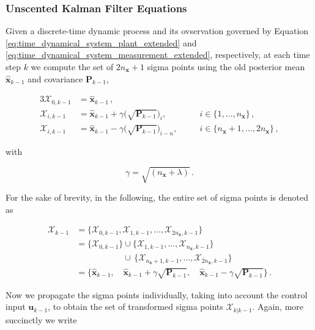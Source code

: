 \subsubsection{Unscented Kalman Filter Equations}

Given a discrete-time dynamic process and its ovservation governed by Equation \ref{eq:time_dynamical_system_plant_extended} and \ref{eq:time_dynamical_system_measurement_extended}, respectively, at each time step $k$ we compute the set of $2n_{\bm{x}}+1$ sigma points using the old posterior mean $\hat{\bm{x}}_{k-1}$ and covariance $\bm{P}_{k-1}$,

\begin{alignat}{3}
  \mathcal{X}_{0, k-1} &= \hat{\bm{x}}_{k-1}\,, \\
  \mathcal{X}_{i, k-1} &= \hat{\bm{x}}_{k-1} + \gamma \Big(\sqrt{ \bm{P}_{k-1}}\Big)_i, &&i \in \{1, \dots, n_{\bm{x}}\}\,, \\
  \mathcal{X}_{i, k-1} &= \hat{\bm{x}}_{k-1} - \gamma \Big(\sqrt{\bm{P}_{k-1}}\Big)_{i-n}, \quad &&i \in \{n_{\bm{x}}+1, \dots, 2n_{\bm{x}}\} \,,
\end{alignat}

\noindent
with

\begin{equation}
  \gamma = \sqrt{(n_{\bm{x}} + \lambda)}\,.
\end{equation}

\noindent
For the sake of brevity, in the following, the entire set of sigma points is denoted as

\begin{equation}
\begin{split}
  \bm{\mathcal{X}}_{k-1} &= \big\{\mathcal{X}_{0, k-1}, \mathcal{X}_{1, k-1}, \dots, \mathcal{X}_{2n_{\bm{x}}, k-1}\big\} \\
  &= \big\{\mathcal{X}_{0, k-1}\big\} \cup \big\{\mathcal{X}_{1, k-1}, \dots, \mathcal{X}_{n_{\bm{x}}, k-1}\big\} \\
  &\mathrel{\phantom{= \big\{\mathcal{X}_{0, k-1}\big\}}} \cup \, \big\{\mathcal{X}_{n_{\bm{x}} + 1, k-1}, \dots, \mathcal{X}_{2n_{\bm{x}}, k-1}\big\} \\
  &= \Big\{\hat{\bm{x}}_{k-1}, \quad \hat{\bm{x}}_{k-1} + \gamma \sqrt{\bm{P}_{k-1}}, \quad \hat{\bm{x}}_{k-1} - \gamma \sqrt{\bm{P}_{k-1}}\Big\}\,.
\end{split}
\end{equation}


Now we propagate the sigma points individually, taking into account the control input $\bm{u}_{k-1}$, to obtain the set of transformed sigma points $ \bm{\mathcal{X}}_{k|k-1}$. Again, more succinctly we write

